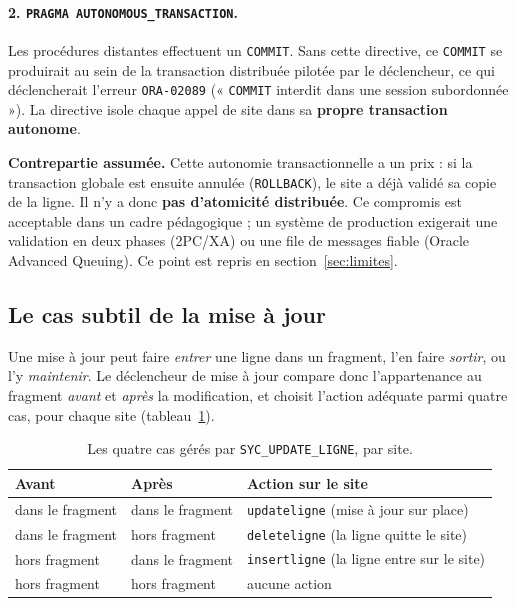 \documentclass[11pt,a4paper]{article}
\begin{document}
\paragraph{2. \texttt{PRAGMA AUTONOMOUS\_TRANSACTION}.}
Les procédures distantes effectuent un \texttt{COMMIT}. Sans cette directive, ce
\texttt{COMMIT} se produirait au sein de la transaction distribuée pilotée par
le déclencheur, ce qui déclencherait l'erreur \texttt{ORA-02089} (« \texttt{COMMIT}
interdit dans une session subordonnée »). La directive isole chaque appel de
site dans sa \textbf{propre transaction autonome}.

\medskip
\noindent\textbf{Contrepartie assumée.} Cette autonomie transactionnelle a un
prix : si la transaction globale est ensuite annulée (\texttt{ROLLBACK}), le
site a déjà validé sa copie de la ligne. Il n'y a donc \textbf{pas d'atomicité
distribuée}. Ce compromis est acceptable dans un cadre pédagogique ; un système
de production exigerait une validation en deux phases (2PC/XA) ou une file de
messages fiable (Oracle Advanced Queuing). Ce point est repris en
section~\ref{sec:limites}.

\subsection{Le cas subtil de la mise à jour}

Une mise à jour peut faire \emph{entrer} une ligne dans un fragment, l'en faire
\emph{sortir}, ou l'y \emph{maintenir}. Le déclencheur de mise à jour compare
donc l'appartenance au fragment \emph{avant} et \emph{après} la modification, et
choisit l'action adéquate parmi quatre cas, pour chaque site
(tableau~\ref{tab:update}).

\begin{table}[h]
\centering
\begin{tabular}{@{}lll@{}}
\toprule
\textbf{Avant} & \textbf{Après} & \textbf{Action sur le site} \\
\midrule
dans le fragment & dans le fragment & \texttt{updateligne} (mise à jour sur place) \\
dans le fragment & hors fragment    & \texttt{deleteligne} (la ligne quitte le site) \\
hors fragment    & dans le fragment & \texttt{insertligne} (la ligne entre sur le site) \\
hors fragment    & hors fragment    & aucune action \\
\bottomrule
\end{tabular}
\caption{Les quatre cas gérés par \texttt{SYC\_UPDATE\_LIGNE}, par site.}
\label{tab:update}
\end{table}
\end{document}
